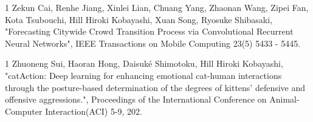  \begin{雑誌論文}{1}
Zekun Cai, Renhe Jiang, Xinlei Lian, Chuang Yang, Zhaonan Wang, Zipei Fan, Kota Tsubouchi, Hill Hiroki Kobayashi, Xuan Song, Ryosuke Shibasaki,  "Forecasting Citywide Crowd Transition Process via Convolutional Recurrent Neural Networks", IEEE Transactions on Mobile Computing 23(5) 5433 - 5445.


 \end{雑誌論文}

 \begin{査読付}{1}
Zhuoneng Sui, Haoran Hong, Daisuké Shimotoku, Hill Hiroki Kobayashi, "catAction: Deep learning for enhancing emotional cat-human interactions through the posture-based determination of the degrees of kittens' defensive and offensive aggressions.", Proceedings of the International Conference on Animal-Computer Interaction(ACI) 5-9, 202.  


 \end{査読付}

